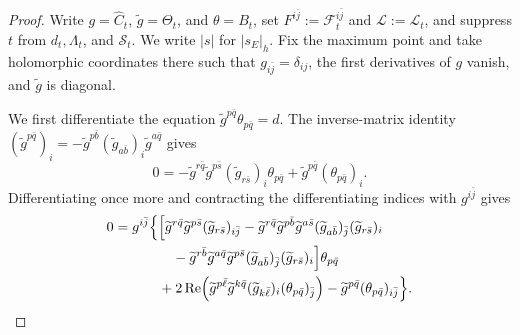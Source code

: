 \documentclass[10pt,a4paper]{amsart}
\begin{document}
\begin{proof}
Write $g=\widehat C_t$, $\widetilde g=\Theta_t$, and
$\theta=B_t$, set $F^{i\bar j}:=\mathcal F_t^{i\bar j}$ and
$\mathcal L:=\mathcal L_t$, and
suppress $t$ from $d_t,\Lambda_t$, and $\mathcal S_t$. We write $|s|$ for
$|s_E|_{h}$.  Fix the maximum point and take
holomorphic coordinates there such that $g_{i\bar j}=\delta_{ij}$,
the first derivatives of $g$ vanish, and $\widetilde g$ is
diagonal.

We first differentiate the equation
$\widetilde g^{p\bar q}\theta_{p\bar q}=d$.  The inverse-matrix
identity $
 (\widetilde g^{p\bar q})_i
 =-\widetilde g^{p\bar b}(\widetilde g_{a\bar b})_i
   \widetilde g^{a\bar q}$
gives
\begin{equation}\label{eq:first-differentiated-J}
 0=-\widetilde g^{r\bar q}\widetilde g^{p\bar s}
 (\widetilde g_{r\bar s})_i\theta_{p\bar q}
 +\widetilde g^{p\bar q}(\theta_{p\bar q})_i.
\end{equation}
Differentiating once more and contracting the differentiating indices
with $g^{i\bar j}$ gives
\begin{align}
0=g^{i\bar j}\Bigl\{&
 \Bigl[\widetilde g^{r\bar q}\widetilde g^{p\bar s}
       (\widetilde g_{r\bar s})_{i\bar j}
 -\widetilde g^{r\bar q}\widetilde g^{p\bar b}
       \widetilde g^{a\bar s}
       (\widetilde g_{a\bar b})_{\bar j}
       (\widetilde g_{r\bar s})_i \notag\\
&\quad
 -\widetilde g^{r\bar b}\widetilde g^{a\bar q}
       \widetilde g^{p\bar s}
       (\widetilde g_{a\bar b})_{\bar j}
       (\widetilde g_{r\bar s})_i\Bigr]\theta_{p\bar q}
 \notag\\
&+2\operatorname{Re}\!\left(
 \widetilde g^{p\bar\ell}\widetilde g^{k\bar q}
 (\widetilde g_{k\bar\ell})_i
 (\theta_{p\bar q})_{\bar j}\right)
 -\widetilde g^{p\bar q}(\theta_{p\bar q})_{i\bar j}
 \Bigr\}.\label{eq:second-differentiated-J}
\end{align}



\end{proof}
\end{document}
